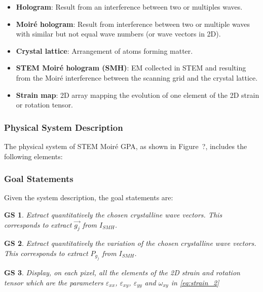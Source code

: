 \documentclass[12pt]{article}
\newcommand{\progname}{STEM Moir{\'e} GPA}
\newtheorem{GS}{GS}
\begin{document}
\begin{itemize}
\item \textbf{Hologram}: Result from an interference between two or multiples waves. 
\item \textbf{Moir{\'e} hologram}: Result from interference between two or multiple waves with similar but not equal wave numbers (or wave vectors in 2D).
\item \textbf{Crystal lattice}: Arrangement of atoms forming matter.\newline
\item \textbf{STEM Moir{\'e} hologram (SMH)}: EM collected in STEM and resulting from the 
Moir{\'e} interference between the scanning grid and the crystal lattice. 
\item \textbf{Strain map}: 2D array mapping the evolution of one element of the 2D strain or rotation 
tensor. 
\end{itemize}

\subsubsection{Physical System Description}

The physical system of \progname{}, as shown in Figure~?,
includes the following elements:





\subsubsection{Goal Statements}

\noindent Given the system description, the goal statements are:
\begin{GS}
\normalfont Extract quantitatively the chosen crystalline wave vectors. This corresponds to extract $\vec{g_{j}}$ from $I_{SMH}$.
\label{GS_1}
\end{GS}
\begin{GS}
\normalfont Extract quantitatively the variation of the chosen crystalline wave vectors. This corresponds to extract $P_{g_{j}}$ from $I_{SMH}$.
\label{GS_2}
\end{GS}
\begin{GS}
\normalfont Display, on each pixel, all the elements of the 2D strain and rotation tensor which are the parameters $\varepsilon_{xx}$, $\varepsilon_{xy}$, $\varepsilon_{yy}$ and $\omega_{xy}$ in \cref{eq:strain_2}
\label{GS_3}
\end{GS}
\end{document}
